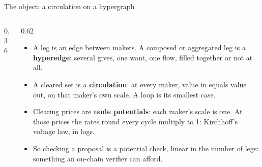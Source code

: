 \documentclass[aspectratio=169,11pt]{beamer}
\begin{document}
\begin{frame}{The object: a circulation on a hypergraph}
  \begin{columns}[c]
    \begin{column}{0.36\textwidth}
      \centering
    \end{column}
    \begin{column}{0.62\textwidth}
      \small
      \begin{itemize}\setlength{\itemsep}{1.6mm}
        \item A leg is an edge between makers. A composed or aggregated leg is a \textbf{hyperedge}: several gives, one want, one flow, filled together or not at all.
        \item A cleared set is a \textbf{circulation}: at every maker, value in equals value out, on that maker's own scale. A loop is its smallest case.
        \item Clearing prices are \textbf{node potentials}: each maker's scale is one. At those prices the rates round every cycle multiply to 1: Kirchhoff's voltage law, in logs.
        \item So checking a proposal is a potential check, linear in the number of legs: something an on-chain verifier can afford.
      \end{itemize}
    \end{column}
  \end{columns}
\end{frame}


\end{document}
